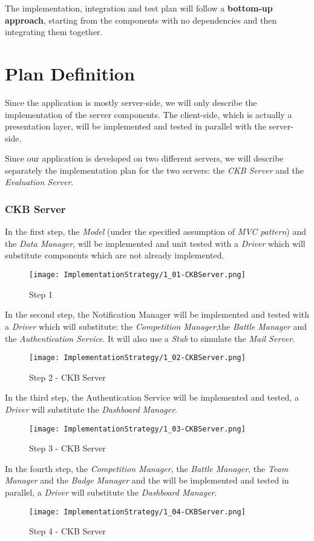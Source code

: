 The implementation, integration and test plan will follow a \textbf{bottom-up approach},
starting from the components with no dependencies and then integrating them together.

\section{Plan Definition}
Since the application is mostly server-side, we will only describe the implementation of the server components.
The client-side, which is actually a presentation layer, will be implemented and tested in parallel with the server-side.

Since our application is developed on two different servers, we will describe separately 
the implementation plan for the two servers: the \textit{CKB Server} and the \textit{Evaluation Server}.
\subsubsection{CKB Server}

In the first step, the \textit{Model} (under the specified assumption of \textit{MVC pattern}) and the \textit{Data Manager}, will be implemented and unit
tested with a \textit{Driver} which will substitute components which are not already implemented.

\begin{figure}[H]
    \label{fig:step1-CKBServer}
    \centering
    \texttt{[image: ImplementationStrategy/1\_01-CKBServer.png]}
    \caption{Step 1}
\end{figure}
\pagebreak

In the second step, the Notification Manager will be implemented and tested with a \textit{Driver} which will substitute: 
the \textit{Competition Manager},the \textit{Battle Manager} and the \textit{Authentication Service}.
It will also use a \textit{Stub} to simulate the \textit{Mail Server}.
\begin{figure}[H]
    \label{fig:step2-CKBServer}
    \centering
    \texttt{[image: ImplementationStrategy/1\_02-CKBServer.png]}
    \caption{Step 2 - CKB Server}
\end{figure}
\pagebreak

In the third step, the Authentication Service will be implemented and tested, a \textit{Driver} will substitute the \textit{Dashboard Manager}.
\begin{figure}[H]
    \label{fig:step3-CKBServer}
    \centering
    \texttt{[image: ImplementationStrategy/1\_03-CKBServer.png]}
    \caption{Step 3 - CKB Server}
\end{figure}
\pagebreak
In the fourth step, the \textit{Competition Manager}, the \textit{Battle Manager}, the \textit{Team Manager}
and the \textit{Badge Manager} and the will be implemented and tested in parallel, a \textit{Driver} will substitute the \textit{Dashboard Manager}.
\begin{figure}[H]
    \label{fig:step4-CKBServer}
    \centering
    \texttt{[image: ImplementationStrategy/1\_04-CKBServer.png]}
    \caption{Step 4 - CKB Server}
\end{figure}
\pagebreak

